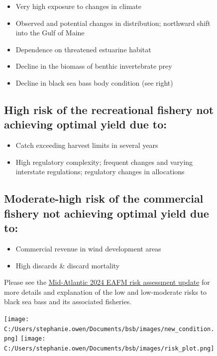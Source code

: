 \documentclass[
  10pt,
  letterpaper,
  DIV=11,
  numbers=noendperiod]{scrartcl}
\providecommand{\tightlist}{%
  \setlength{\itemsep}{0pt}\setlength{\parskip}{0pt}}\usepackage{longtable,booktabs,array}
\begin{document}
\begin{figure}
\begin{minipage}{0.57\linewidth}
\begin{itemize}
\tightlist
\item
  Very high exposure to changes in climate
\item
  Observed and potential changes in distribution; northward shift into
  the Gulf of Maine
\item
  Dependence on threatened estuarine habitat
\item
  Decline in the biomass of benthic invertebrate prey
\item
  Decline in black sea bass body condition (see right)
\end{itemize}

\vspace{-0.25cm}
\subsection{High risk of the recreational fishery not achieving optimal yield due to:}

\begin{itemize}
\tightlist
\item
  Catch exceeding harvest limits in several years
\item
  High regulatory complexity; frequent changes and varying interstate
  regulations; regulatory changes in allocations
\end{itemize}

\vspace{-0.25cm}
\subsection{Moderate-high risk of the commercial fishery not achieving optimal yield due to:}

\begin{itemize}
\tightlist
\item
  Commercial revenue in wind development areas
\item
  High discards \& discard mortality
\end{itemize}

\vspace{-0.25cm}

Please see the
\href{https://static1.squarespace.com/static/511cdc7fe4b00307a2628ac6/t/6747560a3cf66936045e5547/1732728332670/05_EAFM+Risk+Assessment.pdf}{Mid-Atlantic
2024 EAFM risk assessment update} for more details and explanation of
the low and low-moderate risks to black sea bass and its associated
fisheries.\end{minipage}%
%
\begin{minipage}{0.03\linewidth}

\hfill

\end{minipage}%
%
\begin{minipage}{0.40\linewidth}
\texttt{[image: C:/Users/stephanie.owen/Documents/bsb/images/new\_condition.png]}
\texttt{[image: C:/Users/stephanie.owen/Documents/bsb/images/risk\_plot.png]}\end{minipage}%

\end{figure}%
\end{document}

